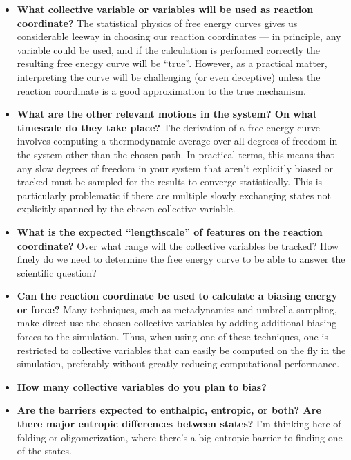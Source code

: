 \begin{itemize}

    \item \textbf{What collective variable or variables will be used as reaction
    coordinate?}  The statistical physics of free energy curves gives us
    considerable leeway in choosing our reaction coordinates --- in principle,
    any variable could be used, and if the calculation is performed correctly
    the resulting free energy curve will be ``true''.  However, as a practical
    matter, interpreting the curve will be challenging (or even deceptive)
    unless the reaction coordinate is a good approximation to the true
    mechanism.

    \item \textbf{What are the other relevant motions in the system? On what
    timescale do they take place?}  The derivation of a free energy curve
    involves computing a thermodynamic average over all degrees of freedom in
    the system other than the chosen path.  In practical terms, this means that
    any slow degrees of freedom in your system that aren't explicitly biased or
    tracked must be sampled for the results to converge statistically.  This is
    particularly problematic if there are multiple slowly exchanging states not
    explicitly spanned by the chosen collective variable.

    \item \textbf{What is the expected ``lengthscale'' of features on the
    reaction coordinate?}  Over what range will the collective variables be
    tracked? How finely do we need to determine the free energy curve to be able
    to answer the scientific question?

    \item \textbf{Can the reaction coordinate be used to calculate a biasing
    energy or force? }  Many techniques, such as metadynamics and umbrella
    sampling, make direct use the chosen collective variables by adding
    additional biasing forces to the simulation.  Thus, when using one of these
    techniques, one is restricted to collective variables that can easily be
    computed on the fly in the simulation, preferably without greatly reducing
    computational performance.

    \item \textbf{How many collective variables do you plan to bias?}

    \item \textbf{Are the barriers expected to enthalpic, entropic, or both? Are
    there major entropic differences between states?}  I'm thinking here of
    folding or oligomerization, where there's a big entropic barrier to finding
    one of the states.

\end{itemize}
